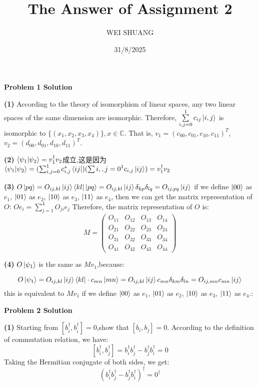 \documentclass[12pt]{article}
\title{The Answer of Assignment 2}
\author{WEI SHUANG}
\date{31/8/2025}
\begin{document}
\maketitle

\begin{center}
    \textbf{Problem 1 Solution}
\end{center}

\textbf{(1)}
According to the theory of isomorphism of linear spaces, any two linear spaces of the same dimension are isomorphic. Therefore, $\sum\limits_{i,j=0}^{1}c_{ij}\ket{i,j}$ is isomorphic to $\{(x_1,x_2,x_3,x_4)\}, x\in \mathbb{C}$. That is, $v_1=(c_{00},c_{01},c_{10},c_{11})^T$, $v_2=(d_{00},d_{01},d_{10},d_{11})^T$.




\textbf{(2)}
$\braket{\psi_1|\psi_2}=v_1^\dagger v_2$成立,这是因为
$\braket{\psi_1|\psi_2}=(\sum_{i,j=0}^1c_{i,j}^*\bra{ij})(\sum{i,,j=0}^1c_{i,j}\ket{ij})=v_1^\dagger v_2$

\textbf{(3)}
$O\ket{pq}=O_{ij,kl}\ket{ij}\bra{kl}\ket{pq}=O_{ij,kl}\ket{ij}\delta_{kp}\delta_{lq}=O_{ij,pq}\ket{ij}$ 
if we define $\ket{00}$ as $e_1$, $\ket{01}$ as $e_2$, $\ket{10}$ as $e_3$, $\ket{11}$ as $e_4$, then we can get the matrix representation of $O$:
$Oe_i=\sum_{j=1}^4O_{ji}e_j$
Therefore, the matrix representation of $O$ is:
\[M=\begin{pmatrix}
O_{11} & O_{12} & O_{13} & O_{14} \\
O_{21} & O_{22} & O_{23} & O_{24} \\
O_{31} & O_{32} & O_{33} & O_{34} \\
O_{41} & O_{42} & O_{43} & O_{44}    
\end{pmatrix}\]

\textbf{(4)}
$O\ket{\psi_1}$ is the same as $Mv_1$,because:

\[
O\ket{\psi_1}=O_{ij,kl}\ket{ij}\bra{kl}\cdot c_{mn}\ket{mn}=O_{ij,kl}\ket{ij}c_{mn}\delta_{km}\delta_{ln}=O_{ij,mn}c_{mn}\ket{ij}
\]
this is equivalent to $Mv_1$ if we define $\ket{00}$ as $e_1$, $\ket{01}$ as $e_2$, $\ket{10}$ as $e_3$, $\ket{11}$ as $e_4$.:
\begin{center}
    \textbf{Problem 2 Solution}
\end{center}

\textbf{(1)}
Starting from $[b_i^\dagger,b_i^\dagger]=0$,show that $[b_i,b_j]=0$.
According to the definition of commutation relation, we have:
\[[b_i^\dagger,b_j^\dagger]=b_i^\dagger b_j^\dagger - b_j^\dagger b_i^\dagger=0\]
Taking the Hermitian conjugate of both sides, we get:
\[(b_i^\dagger b_j^\dagger - b_j^\dagger b_i^\dagger)^\dagger = 0^\dagger\]
\end{document}
